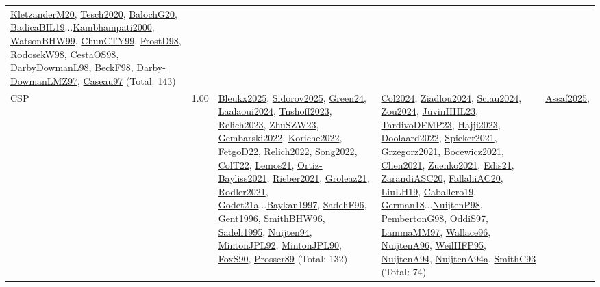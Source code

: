 {\begin{longtable}{p{3cm}r>{\raggedright\arraybackslash}p{6cm}>{\raggedright\arraybackslash}p{6cm}>{\raggedright\arraybackslash}p{8cm}}
\hyperref[detail:KletzanderM20]{KletzanderM20}, \hyperref[detail:Tesch2020]{Tesch2020}, \hyperref[detail:BalochG20]{BalochG20}, \hyperref[detail:BadicaBIL19]{BadicaBIL19}...\hyperref[detail:Kambhampati2000]{Kambhampati2000}, \hyperref[detail:WatsonBHW99]{WatsonBHW99}, \hyperref[detail:ChunCTY99]{ChunCTY99}, \hyperref[detail:FrostD98]{FrostD98}, \hyperref[detail:RodosekW98]{RodosekW98}, \hyperref[detail:CestaOS98]{CestaOS98}, \hyperref[detail:DarbyDowmanL98]{DarbyDowmanL98}, \hyperref[detail:BeckF98]{BeckF98}, \hyperref[detail:Darby-DowmanLMZ97]{Darby-DowmanLMZ97}, \hyperref[detail:Caseau97]{Caseau97} (Total: 143)\\
\index{CSP}\index{CP!CSP}CSP &  1.00 & \hyperref[detail:Bleukx2025]{Bleukx2025}, \hyperref[detail:Sidorov2025]{Sidorov2025}, \hyperref[detail:Green24]{Green24}, \hyperref[detail:Laalaoui2024]{Laalaoui2024}, \hyperref[detail:Tnshoff2023]{Tnshoff2023}, \hyperref[detail:Relich2023]{Relich2023}, \hyperref[detail:ZhuSZW23]{ZhuSZW23}, \hyperref[detail:Gembarski2022]{Gembarski2022}, \hyperref[detail:Koriche2022]{Koriche2022}, \hyperref[detail:FetgoD22]{FetgoD22}, \hyperref[detail:Relich2022]{Relich2022}, \hyperref[detail:Song2022]{Song2022}, \hyperref[detail:ColT22]{ColT22}, \hyperref[detail:Lemos21]{Lemos21}, \hyperref[detail:Ortiz-Bayliss2021]{Ortiz-Bayliss2021}, \hyperref[detail:Rieber2021]{Rieber2021}, \hyperref[detail:Groleaz21]{Groleaz21}, \hyperref[detail:Rodler2021]{Rodler2021}, \hyperref[detail:Godet21a]{Godet21a}...\hyperref[detail:Baykan1997]{Baykan1997}, \hyperref[detail:SadehF96]{SadehF96}, \hyperref[detail:Gent1996]{Gent1996}, \hyperref[detail:SmithBHW96]{SmithBHW96}, \hyperref[detail:Sadeh1995]{Sadeh1995}, \hyperref[detail:Nuijten94]{Nuijten94}, \hyperref[detail:MintonJPL92]{MintonJPL92}, \hyperref[detail:MintonJPL90]{MintonJPL90}, \hyperref[detail:FoxS90]{FoxS90}, \hyperref[detail:Prosser89]{Prosser89} (Total: 132) & \hyperref[detail:Col2024]{Col2024}, \hyperref[detail:Ziadlou2024]{Ziadlou2024}, \hyperref[detail:Sciau2024]{Sciau2024}, \hyperref[detail:Zou2024]{Zou2024}, \hyperref[detail:JuvinHHL23]{JuvinHHL23}, \hyperref[detail:TardivoDFMP23]{TardivoDFMP23}, \hyperref[detail:Hajji2023]{Hajji2023}, \hyperref[detail:Doolaard2022]{Doolaard2022}, \hyperref[detail:Spieker2021]{Spieker2021}, \hyperref[detail:Grzegorz2021]{Grzegorz2021}, \hyperref[detail:Bocewicz2021]{Bocewicz2021}, \hyperref[detail:Chen2021]{Chen2021}, \hyperref[detail:Zuenko2021]{Zuenko2021}, \hyperref[detail:Edis21]{Edis21}, \hyperref[detail:ZarandiASC20]{ZarandiASC20}, \hyperref[detail:FallahiAC20]{FallahiAC20}, \hyperref[detail:LiuLH19]{LiuLH19}, \hyperref[detail:Caballero19]{Caballero19}, \hyperref[detail:German18]{German18}...\hyperref[detail:NuijtenP98]{NuijtenP98}, \hyperref[detail:PembertonG98]{PembertonG98}, \hyperref[detail:OddiS97]{OddiS97}, \hyperref[detail:LammaMM97]{LammaMM97}, \hyperref[detail:Wallace96]{Wallace96}, \hyperref[detail:NuijtenA96]{NuijtenA96}, \hyperref[detail:WeilHFP95]{WeilHFP95}, \hyperref[detail:NuijtenA94]{NuijtenA94}, \hyperref[detail:NuijtenA94a]{NuijtenA94a}, \hyperref[detail:SmithC93]{SmithC93} (Total: 74) & \hyperref[detail:Assaf2025]{Assaf2025}, 
\end{longtable}}
